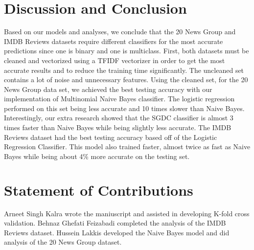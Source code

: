 \documentclass[11pt]{homework}
\begin{document}
\section{Discussion and Conclusion}
Based on our models and analyses, we conclude that the 20 News Group and IMDB Reviews datasets require different classifiers for the most accurate predictions since one is binary and one is multiclass. First, both datasets must be cleaned and vectorized using a TFIDF vectorizer in order to get the most accurate results and to reduce the training time significantly. The uncleaned set contains a lot of noise and unnecessary features. Using the cleaned set, for the 20 News Group data set, we achieved the best testing accuracy with our implementation of Multinomial Naive Bayes classifier. The logistic regression performed  on this set being less accurate and 10 times slower than Naive Bayes. Interestingly, our extra research showed that the SGDC classifier is almost 3 times faster than Naive Bayes while being slightly less accurate. The IMDB Reviews dataset had the best testing accuracy based off of the Logistic Regression Classifier. This model also trained faster, almost twice as fast as Naive Bayes while being about 4\% more accurate on the testing set.

\section{Statement of Contributions}
Arneet Singh Kalra wrote the maniuscript and assisted in developing K-fold cross validation. Behnaz Ghefati Feizabadi completed the analysis of the IMDB Reviews dataset. Hussein Lakkis developed the Naive Bayes model and did analysis of the 20 News Group dataset. 

\printbibliography
\end{document}
